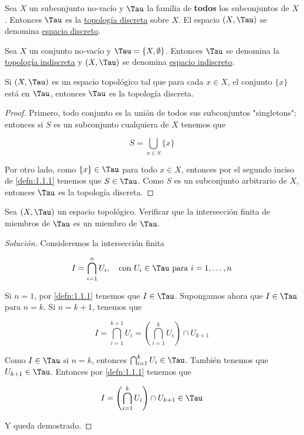 \begin{defn}
    Sea $X$ un subconjunto no-vacío y $\Tau$ la familia de \textbf{todos} los subconjuntos de $X$. Entonces $\Tau$ es la \ul{topología discreta} sobre $X$. El espacio $(X, \Tau)$ se denomina \ul{espacio discreto}.
\end{defn}

\begin{defn}
    Sea $X$ un conjunto no-vacío y $\Tau = \{X, \emptyset\}$. Entonces $\Tau$ se denomina la \ul{topología indiscreta} y $(X, \Tau)$ se denomina \ul{espacio indiscreto}.
\end{defn}

\begin{pro}
    Si $(X, \Tau)$ es un espacio topológico tal que para cada $x \in X$, el conjunto $\{x\}$ está en $\Tau$, entonces $\Tau$ es la topología discreta.
\end{pro}

\begin{proof}
    Primero, todo conjunto es la unión de todos sus subconjuntos "singletons"; entonces si $S$ es un subconjunto cualquiera de $X$ tenemos que
    
    \[
    S = \bigcup_{x \in S} \{x\}
    \]
    
    Por otro lado, como $\{x\} \in \Tau$ para todo $x \in X$, entonces por el segundo inciso de \ref{defn:1.1.1} tenemos que $S \in \Tau$. Como $S$ es un subconjunto arbitrario de $X$, entonces $\Tau$ es la topología discreta.
\end{proof}

\begin{ejer}\label{ejer:1.1.1}
    Sea $(X, \Tau)$ un espacio topológico. Verificar que la intersección finita de miembros de $\Tau$ es un miembro de $\Tau$.
\end{ejer}

\begin{proof}[Solución]
    Consideremos la intersección finita
    
    \[
    I = \bigcap_{i = 1}^n U_i, \quad \text{con $U_i \in \Tau$ para $i = 1, \dots, n$}
    \]
    
    Si $n=1$, por \ref{defn:1.1.1} tenemos que $I \in \Tau$. Supongamos ahora que $I \in \Tau$ para $n = k$. Si $n = k+1$, tenemos que
    
    \[
    I = \bigcap_{i = 1}^{k+1} U_i = \left( \bigcap_{i=1}^k U_i \right) \cap U_{k+1}
    \]
    
    Como $I \in \Tau$ si $n=k$, entonces $\bigcap_{i=1}^k U_i \in \Tau$. También tenemos que $U_{k+1} \in \Tau$. Entonces por \ref{defn:1.1.1} tenemos que
    
    \[
    I = \left( \bigcap_{i=1}^k U_i \right) \cap U_{k+1} \in \Tau
    \]
    
    Y queda demostrado.
\end{proof}

